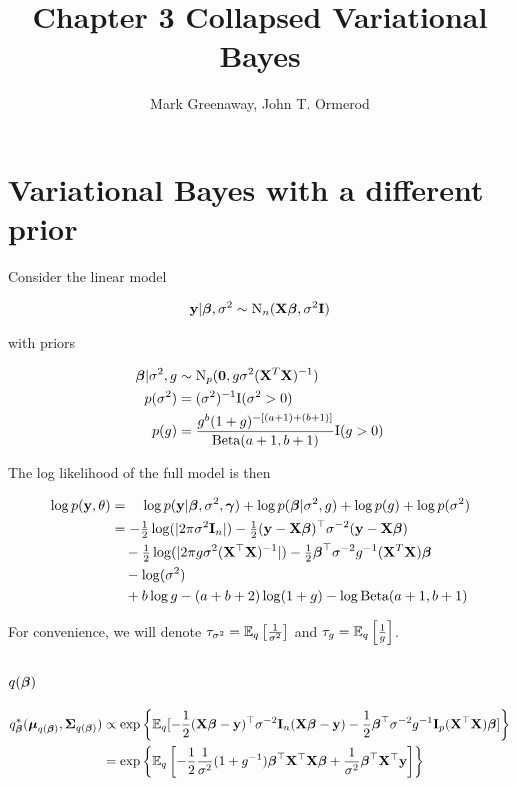 \documentclass{amsart}[12pt]
\title{Chapter 3 Collapsed Variational Bayes}
\author{Mark Greenaway, John T. Ormerod}
\begin{document}
\section{Variational Bayes with a different prior}

Consider the linear model

\begin{align*}
{\bf y} | {\boldsymbol \beta}, \sigma^2 \sim \text{N}_n({\bf X} {\boldsymbol \beta}, \sigma^2 {\bf I})
\end{align*}

with priors

\begin{align*}
{\boldsymbol\beta} | \sigma^2, g &\sim \text{N}_p({\bf 0}, g \sigma^2 ({\bf X}^T {\bf X})^{-1}) \\
p(\sigma^2) &= (\sigma^2)^{-1} \text{I}(\sigma^2 > 0) \\
p(g) &= \frac{g^b (1 + g)^{-[(a + 1) + (b + 1)]}}{\text{Beta}(a + 1, b + 1)} \text{I}(g > 0)
\end{align*}

The log likelihood of the full model is then

\begin{align*}
\log p({\bf y}, \theta) &= \quad\log p({\bf y}|{\boldsymbol \beta}, \sigma^2, {\boldsymbol \gamma}) + \log p({\boldsymbol \beta} | \sigma^2, g) +  \log p(g) + \log p(\sigma^2)\\
&= -\tfrac{1}{2} \log(|2 \pi \sigma^2 {\bf I}_n|) - \tfrac{1}{2} ({\bf y} - {\bf X} {\boldsymbol \beta})^\top \sigma^{-2} ({\bf y} - {\bf X} {\boldsymbol \beta}) \\
&\quad -\tfrac{1}{2} \log(|2 \pi g \sigma^2 ({\bf X}^\top {\bf X})^{-1}|) -\tfrac{1}{2} {\boldsymbol \beta}^\top \sigma^{-2} g^{-1} ({\bf X}^T {\bf X}) {\boldsymbol \beta} \\
&\quad - \log (\sigma^2) \\
&\quad + b \log g - (a + b + 2) \log (1 + g) - \log \text{Beta}(a + 1, b + 1)
\end{align*}

For convenience, we will denote $\tau_{\sigma^2} = \mathbb{E}_q \left[ \frac{1}{\sigma^2} \right]$ and $\tau_{g} =
\mathbb{E}_q \left[ \frac{1}{g} \right]$.


\subsection{$q({\boldsymbol \beta})$}

\begin{align*}
q_{\boldsymbol \beta}^*({\boldsymbol \mu}_{q({\boldsymbol \beta})}, {\boldsymbol \Sigma}_{q({\boldsymbol \beta})}) &\propto \exp \left \{ \mathbb{E}_q[-\frac{1}{2} ({\bf X} {\boldsymbol \beta} - {\bf y})^\top \sigma^{-2} {\bf I}_n ({\bf X} {\boldsymbol \beta} - {\bf y}) - \frac{1}{2} {\boldsymbol \beta}^\top \sigma^{-2} g^{-1} {\bf I}_p ({\bf X}^\top {\bf X}) {\boldsymbol \beta}] \right \}\\
&= \exp \left \{ \mathbb{E}_q \left[-\frac{1}{2} \frac{1}{\sigma^2} (1 + g^{-1}){\boldsymbol \beta}^\top {\bf X}^\top {\bf X} {\boldsymbol\beta} + \frac{1}{\sigma^2}{\boldsymbol \beta}^\top {\bf X}^\top {\bf y} \right] \right \}
\end{align*}
\end{document}
